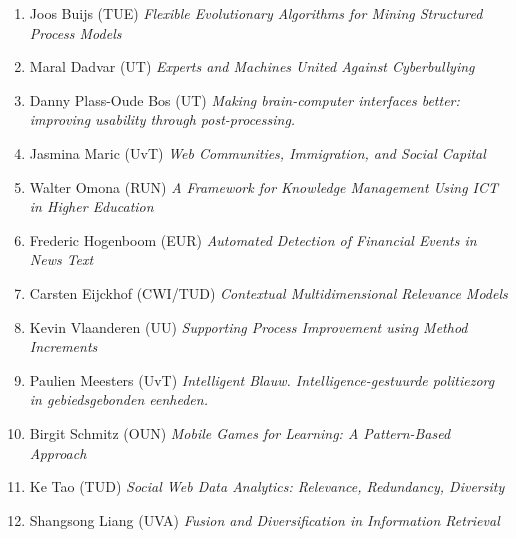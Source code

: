 \begin{multicols}{2}
\begin{scriptsize}
\begin{enumerate}[leftmargin=*,noitemsep,topsep=0pt,parsep=1pt,partopsep=0pt]
{}\item Joos Buijs (TUE) \textit{Flexible Evolutionary Algorithms for Mining Structured Process Models
}\item Maral Dadvar (UT) \textit{Experts and Machines United Against Cyberbullying
}\item Danny Plass-Oude Bos (UT) \textit{Making brain-computer interfaces better: improving usability through post-processing.
}\item Jasmina Maric (UvT) \textit{Web Communities, Immigration, and Social Capital
}\item Walter Omona (RUN) \textit{A Framework for Knowledge Management Using ICT in Higher Education
}\item Frederic Hogenboom (EUR) \textit{Automated Detection of Financial Events in News Text
}\item Carsten Eijckhof (CWI/TUD) \textit{Contextual Multidimensional Relevance Models
}\item Kevin Vlaanderen (UU) \textit{Supporting Process Improvement using Method Increments 
}\item Paulien Meesters (UvT) \textit{Intelligent Blauw. Intelligence-gestuurde politiezorg in gebiedsgebonden eenheden.
}\item Birgit Schmitz (OUN) \textit{Mobile Games for Learning: A Pattern-Based Approach 
}\item Ke Tao (TUD) \textit{Social Web Data Analytics: Relevance, Redundancy, Diversity
}\item Shangsong Liang (UVA) \textit{Fusion and Diversification in Information Retrieval}
\end{enumerate}


\end{scriptsize}
\end{multicols}
